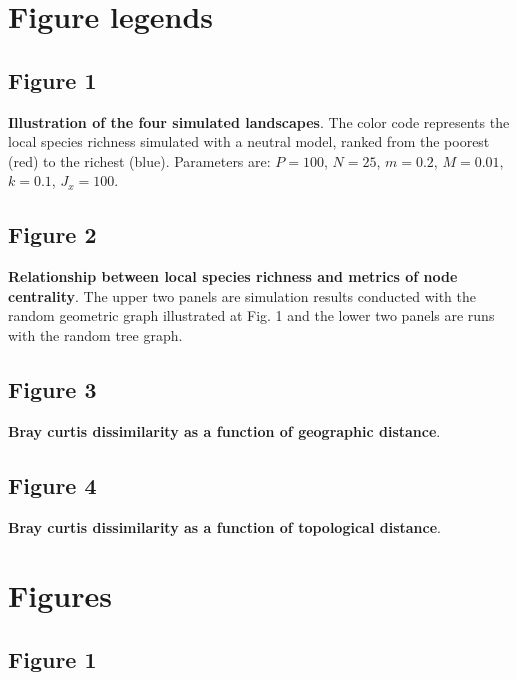 \documentclass[12pt]{article}
\begin{document}
\printbibliography

\newpage
\section*{Figure legends}

\subsection*{Figure 1}
\textbf{Illustration of the four simulated landscapes}. The color code
represents the local species richness simulated with a neutral model, ranked
from the poorest (red) to the richest (blue). Parameters are: $P = 100$, $N =
25$, $m = 0.2$, $M = 0.01$, $k = 0.1$, $J_x = 100$.

\subsection*{Figure 2}
\textbf{Relationship between local species richness and metrics of node
centrality}. The upper two panels are simulation results conducted with the
random geometric graph illustrated at Fig. 1 and the lower two panels are runs
with the random tree graph. 

\subsection*{Figure 3}
\textbf{Bray curtis dissimilarity as a function of geographic distance}. 

\subsection*{Figure 4}
\textbf{Bray curtis dissimilarity as a function of topological distance}. 

\newpage

\section*{Figures}

\subsection*{Figure 1}
\end{document}
